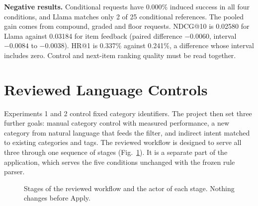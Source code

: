 \documentclass[conference]{IEEEtran}
\begin{document}
\textbf{Negative results.} Conditional requests have 0.000\% induced success in all four conditions, and Llama matches only 2 of 25 conditional references. The pooled gain comes from compound, graded and floor requests. NDCG@10 is 0.02580 for Llama against 0.03184 for item feedback (paired difference $-0.0060$, interval $-0.0084$ to $-0.0038$). HR@1 is 0.337\% against 0.241\%, a difference whose interval includes zero. Control and next-item ranking quality must be read together.

\section{Reviewed Language Controls}\label{sec:workflow}
Experiments 1 and 2 control fixed category identifiers. The project then set three further goals: manual category control with measured performance, a new category from natural language that feeds the filter, and indirect intent matched to existing categories and tags. The reviewed workflow is designed to serve all three through one sequence of stages (Fig.~\ref{fig:stages}). It is a separate part of the application, which serves the five conditions unchanged with the frozen rule parser.

\begin{figure}[t]\centering
\newcommand{\stage}[2]{#1\vphantom{pl}\\[-1.5pt]{\fontsize{6}{7}\selectfont #2\vphantom{pl}}}
\caption{Stages of the reviewed workflow and the actor of each stage. Nothing changes before Apply.}\label{fig:stages}
\end{figure}
\end{document}
